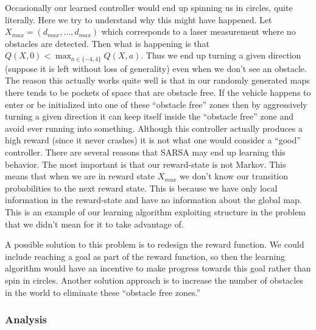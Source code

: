 \documentclass{article}
\begin{document}
Occasionally our learned controller would end up spinning us in circles, quite literally. Here we try to understand why this might have happened. 
Let $X_{max} = (d_{max}, \ldots, d_{max})$ which corresponds to a laser measurement where no obstacles are detected. Then what is happening is that $Q(X,0) < \max_{a \in \{-4,4\}} Q(X,a)$. Thus we end up turning a given direction (suppose it is left without loss of generality) even when we don't see an obstacle. The reason this actually works quite well is that in our randomly generated maps there tends to be pockets of space that are obstacle free. If the vehicle happens to enter or be initialized into one of these ``obstacle free'' zones then by aggressively turning a given direction it can keep itself inside the ``obstacle free'' zone and avoid ever running into something. Although this controller actually produces a high reward (since it never crashes) it is not what one would consider a ``good'' controller. There are several reasons that SARSA may end up learning this behavior. The most important is that our reward-state is not Markov. This means that when we are in reward state $X_{max}$ we don't know our transition probabilities to the next reward state. This is because we have only local information in the reward-state and have no information about the global map. This is an example of our learning algorithm exploiting structure in the problem that we didn't mean for it to take advantage of.

A possible solution to this problem is to redesign the reward function. We could include reaching a goal as part of the reward function, so then the learning algorithm would have an incentive to make progress towards this goal rather than spin in circles. Another solution approach is to increase the number of obstacles in the world to eliminate these ``obstacle free zones.''


\subsubsection{Analysis}
\label{sarsa_analysis}
\end{document}
